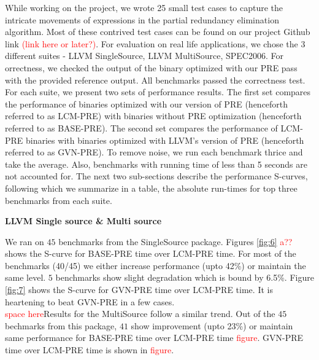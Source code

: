 \documentclass[10pt,twoside]{report}
\begin{document}
While working on the project, we wrote 25 small test cases to capture the intricate movements
of expressions in the partial redundancy elimination algorithm. Most of these contrived test cases can 
be found on our project Github link \textcolor{red}{(link here or later?)}. For evaluation on real life applications, we
chose the 3 different suites - LLVM SingleSource, LLVM MultiSource, SPEC2006. For orrectness, we checked the 
output of the binary optimized with our PRE pass with the provided reference output. All benchmarks passed the 
correctness test. For each suite, we present two sets of performance results. The first set compares the performance
of binaries optimized with our version of PRE (henceforth referred to as LCM-PRE) with binaries without PRE
optimization (henceforth referred to as BASE-PRE). The second set compares the performance of LCM-PRE binaries with binaries optimized with LLVM's version of PRE (henceforth referred to as GVN-PRE). To remove noise, we run each benchmark thrice and take the average. Also, benchmarks with running time of less than 5 seconds are not accounted for. The next two sub-sections describe the performance S-curves, following which we summarize in a table, the absolute run-times for top three benchmarks from each suite.

\begin{flushleft}
\textbf{\normalsize{LLVM Single source \& Multi source}}
\end{flushleft}

We ran on $45$ benchmarks from the SingleSource package. Figures \ref{fig:6} \textcolor{red}{a??} shows the S-curve for BASE-PRE time over LCM-PRE time. For most of the benchmarks (40/45) we either increase performance (upto 42\%) or maintain the same level. $5$ benchmarks show slight degradation which is bound by 6.5\%. Figure \ref{fig:7} shows the S-curve for GVN-PRE time over LCM-PRE time. It is heartening to beat GVN-PRE in a few cases. \\
\textcolor{red}{space here}Results for the MultiSource follow a similar trend. Out of the $45$ bechmarks from this package, $41$ show improvement (upto 23\%) or maintain same performance for BASE-PRE time over LCM-PRE time \textcolor{red}{figure}. GVN-PRE time over LCM-PRE time is shown in \textcolor{red}{figure}.
\end{document}

